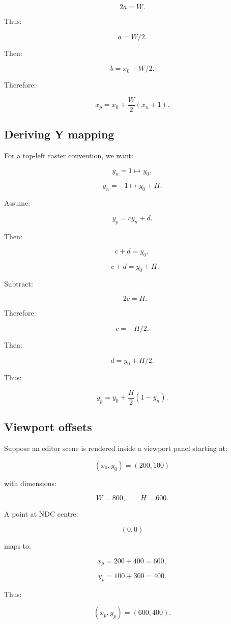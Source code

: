 \[
 2a=W.
\]

Thus:

\[
 a=W/2.
\]

Then:

\[
 b=x_0+W/2.
\]

Therefore:

\[
 \boxed{ x_p=x_0+\frac W2(x_n+1) }.
\]

\subsection{Deriving Y mapping}\label{02-foundations-ii-ch033-deriving-y-mapping}

For a top-left raster convention, we want:

\[
 y_n=1\mapsto y_0,
\]

\[
 y_n=-1\mapsto y_0+H.
\]

Assume:

\[
 y_p=cy_n+d.
\]

Then:

\[
 c+d=y_0,
\]

\[
 -c+d=y_0+H.
\]

Subtract:

\[
 -2c=H.
\]

Therefore:

\[
 c=-H/2.
\]

Then:

\[
 d=y_0+H/2.
\]

Thus:

\[
 \boxed{ y_p=y_0+\frac H2(1-y_n) }.
\]

\subsection{Viewport offsets}\label{02-foundations-ii-ch033-viewport-offsets}

Suppose an editor scene is rendered inside a viewport panel starting at:

\[
 (x_0,y_0)=(200,100)
\]

with dimensions:

\[
 W=800,\qquad H=600.
\]

A point at NDC centre:

\[
 (0,0)
\]

maps to:

\[
 x_p=200+400=600,
\]

\[
 y_p=100+300=400.
\]

Thus:

\[
 \boxed{(x_p,y_p)=(600,400)}.
\]

